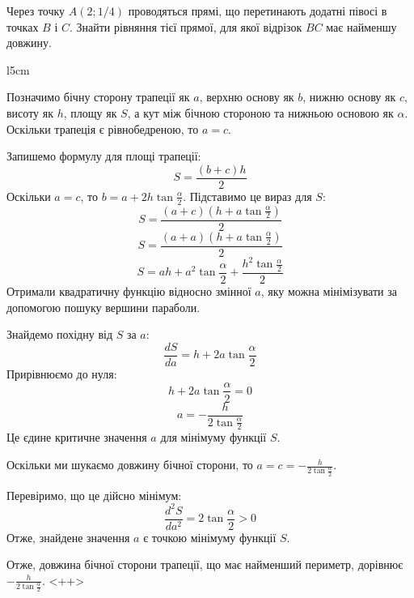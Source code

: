\documentclass[../rgr1.tex]{subfiles}
\begin{document}
	Через точку $A (2; 1/4)$ проводяться прямі, що перетинають
	додатні півосі в точках $B$ і $C$. Знайти рівняння тієї
	прямої, для якої відрізок $BC$ має найменшу довжину.

\Solution

\begin{wrapfigure}{l}{5cm}
\end{wrapfigure}

Позначимо бічну сторону трапеції як $a$, верхню основу як $b$, нижню основу як $c$, висоту як $h$, площу як $S$, а кут між бічною стороною та нижньою основою як $\alpha$. Оскільки трапеція є рівнобедреною, то $a=c$.

Запишемо формулу для площі трапеції:
$$S=\frac{(b+c)h}{2}$$
Оскільки $a=c$, то $b=a+2h\tan\frac{\alpha}{2}$. Підставимо це вираз для $S$:
$$S=\frac{(a+c)(h+a\tan\frac{\alpha}{2})}{2}$$
$$S=\frac{(a+a)(h+a\tan\frac{\alpha}{2})}{2}$$
$$S=ah+a^2\tan\frac{\alpha}{2}+ \frac{h^2\tan\frac{\alpha}{2}}{2}$$
Отримали квадратичну функцію відносно змінної $a$, яку можна мінімізувати за допомогою пошуку вершини параболи.

Знайдемо похідну від $S$ за $a$:
$$\frac{dS}{da}=h+2a\tan\frac{\alpha}{2}$$
Прирівнюємо до нуля:
$$h+2a\tan\frac{\alpha}{2}=0$$
$$a=-\frac{h}{2\tan\frac{\alpha}{2}}$$
Це єдине критичне значення $a$ для мінімуму функції $S$.

Оскільки ми шукаємо довжину бічної сторони, то $a=c=-\frac{h}{2\tan\frac{\alpha}{2}}$.

Перевіримо, що це дійсно мінімум:
$$\frac{d^2S}{da^2}=2\tan\frac{\alpha}{2}>0$$
Отже, знайдене значення $a$ є точкою мінімуму функції $S$.

Отже, довжина бічної сторони трапеції, що має найменший периметр, дорівнює $-\frac{h}{2\tan\frac{\alpha}{2}}$.
<++>

\Answer{<++>}
\end{document}
